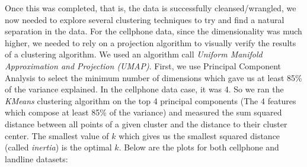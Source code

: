 \documentclass[20pt]{article} %
\begin{document}
Once this was completed, that is, the data is successfully cleansed/wrangled, we now needed to explore several clustering techniques to try and find a natural separation in the data.  For the cellphone data, since the dimensionality was much higher, we needed to rely on a projection algorithm to visually verify the results of a clustering algorithm.  We used an algorithm call \textit{Uniform Manifold Approximation and Projection (UMAP)}.  First, we use Principal Component Analysis to select the minimum number of dimensions which gave us at least 85\% of the variance explained.  In the cellphone data case, it was 4.  So we ran the \textit{KMeans} clustering algorithm on the top 4 principal components (The 4 features which compose at least 85\% of the variance) and measured the sum squared distance between all points of a given cluster and the distance to their cluster center.  The smallest value of $k$ which gives us the smallest squared distance (called \textit{inertia}) is the optimal $k$.  Below are the plots for both cellphone and landline datasets:
\end{document}
